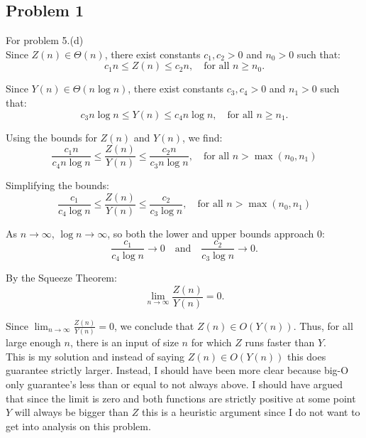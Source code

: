 \documentclass[12pt, letterpaper]{article}
\theoremstyle{definition}
\begin{document}
\pagestyle{fancy}
\fancyhf{}
\fancyhead[ROE]{\thepage}

\subsection*{Problem 1}
For problem 5.(d)\\
Since $Z(n) \in \Theta(n)$, there exist constants $c_1, c_2 > 0$ and $n_0 > 0$ such that:
      \[
      c_1 n \leq Z(n) \leq c_2 n, \quad \text{for all } n \geq n_0.
      \]

      Since $Y(n) \in \Theta(n \log n)$, there exist constants $c_3, c_4 > 0$ and $n_1 > 0$ such that:
      \[
      c_3 n \log n \leq Y(n) \leq c_4 n \log n, \quad \text{for all } n \geq n_1.
      \]

      Using the bounds for $Z(n)$ and $Y(n)$, we find:
      \[
      \frac{c_1 n}{c_4 n \log n} \leq \frac{Z(n)}{Y(n)} \leq \frac{c_2 n}{c_3 n \log n}, \quad \text{for all } n > \max(n_0,n_1)
      \]

      Simplifying the bounds:
      \[
      \frac{c_1}{c_4 \log n} \leq \frac{Z(n)}{Y(n)} \leq \frac{c_2}{c_3 \log n}, \quad \text{for all } n > \max(n_0,n_1)
      \]

      As $n \to \infty$, $\log n \to \infty$, so both the lower and upper bounds approach 0:
      \[
      \frac{c_1}{c_4 \log n} \to 0 \quad \text{and} \quad \frac{c_2}{c_3 \log n} \to 0.
      \]

      By the Squeeze Theorem:
      \[
      \lim_{n \to \infty} \frac{Z(n)}{Y(n)} = 0.
      \]

      Since $\lim_{n \to \infty} \frac{Z(n)}{Y(n)} = 0$, we conclude that $Z(n) \in O(Y(n))$. Thus, for all large enough $n$, there is an input of size $n$ for which $Z$ runs faster than $Y$.\\
      This is my solution and instead of saying $Z(n) \in O(Y(n))$ this does guarantee strictly larger. Instead, I should have been more clear because big-O only guarantee's less than or equal to not always above. I should have argued that since the limit is zero and both functions are strictly positive at some point $Y$ will always be bigger than $Z$ this is a heuristic argument since I do not want to get into analysis on this problem.

\newpage
\end{document}
